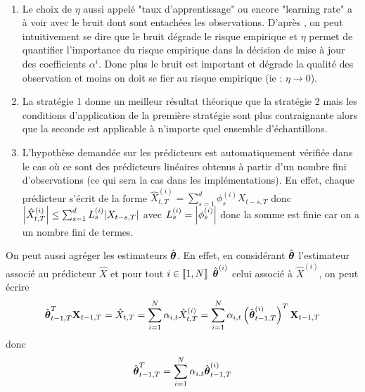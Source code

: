 \documentclass{report}
\begin{document}
\begin{Rque}~\\
\begin{enumerate}
\item 
Le choix de $\eta$ aussi appelé "taux d'apprentissage" ou encore "learning rate" a à voir avec le bruit dont sont entachées les observations. D'après  \citep{giraud-roueff-sanchez-aos2015}, on peut intuitivement se dire que le bruit dégrade le risque empirique et $\eta$ permet de quantifier l'importance du risque empirique dans la décision de mise à jour des coefficients $\alpha^{i}$. Donc plus le bruit est important et dégrade la qualité des observation et moins on doit se fier au risque empirique (ie : $\eta {\rightarrow} 0$).
\item 
La stratégie 1 donne un meilleur résultat théorique que la stratégie 2 mais les conditions d'application de la première stratégie sont plus contraignante alors que la seconde est applicable à n'importe quel ensemble d'échantillons.
\item 
L'hypothèse demandée sur les prédicteurs est automatiquement vérifiée dans le cas où ce sont des prédicteurs linéaires obtenus à partir d'un nombre fini d'observations (ce qui sera la cas dans les implémentations). En effet, chaque prédicteur s'écrit de la forme $\hat{X}_{t,T}^{(i)} = \sum_{s=1}^d \phi_s^{(i)} X_{t-s,T}$ donc ${ \left| \hat{X}_{t,T}^{(i)} \right|} \leq  \sum_{s=1}^d L_s^{(i)} { \left| X_{t-s,T} \right|}$ avec $ L_s^{(i)} = { \left|  \phi_s^{(i)} \right|}$ donc la somme est finie car on a un nombre fini de termes. 
\end{enumerate}
\end{Rque}
\begin{Rque}
On peut aussi agréger les estimateurs $\hat{\boldsymbol{\theta}}$. En effet, en considérant $\hat{\boldsymbol{\theta}}$ l'estimateur associé au prédicteur $\hat{X}$ et pour tout $i\in {\left\llbracket 1,N \right\rrbracket}$ $\hat{\boldsymbol{\theta}}^{(i)}$ celui associé à $\hat{X}^{(i)}$, on peut écrire 
$$
\hat{\boldsymbol{\theta}}_{t-1,T}^T \mathbf{X}_{t-1,T} = \hat{X}_{t,T} = \sum_{i=1}^N \alpha_{i,t} \hat{X}_{t,T}^{(i)} = \sum_{i=1}^N \alpha_{i,t} \left( \hat{\boldsymbol{\theta}}_{t-1,T}^{(i)} \right)^T \mathbf{X}_{t-1,T}
$$
donc 
$$
\hat{\boldsymbol{\theta}}_{t-1,T}^T = \sum_{i=1}^N \alpha_{i,t} \hat{\boldsymbol{\theta}}_{t-1,T}^{(i)}
$$
\end{Rque}
\end{document}
